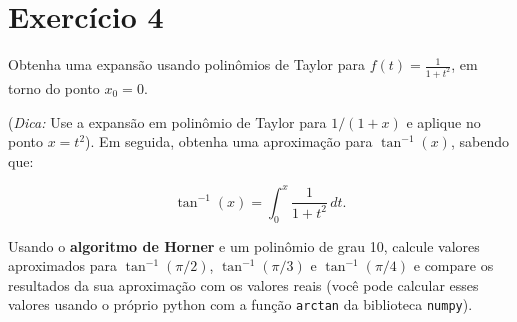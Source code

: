 \section{Exercício 4}
Obtenha uma expansão usando polinômios de Taylor para $f(t) = \frac{1}{1 + t^2}$, em torno do ponto $x_0 = 0$. \linebreak

(\textit{Dica:} Use a expansão em polinômio de Taylor para $1/(1 + x)$ e aplique no ponto $x = t^2$). \linebreak
Em seguida, obtenha uma aproximação para $\tan^{-1}(x)$, sabendo que:\linebreak

\[
    \tan^{-1}(x) = \int_0^x \frac{1}{1 + t^2} \, dt.
\]

\vspace{1em}  %

Usando o \textbf{algoritmo de Horner} e um polinômio de grau 10, calcule valores aproximados para $\tan^{-1}(\pi/2)$, $\tan^{-1}(\pi/3)$ e $\tan^{-1}(\pi/4)$ e compare os resultados da sua aproximação com os valores reais (você pode calcular esses valores usando o próprio python com a função \texttt{arctan} da biblioteca \texttt{numpy}).


